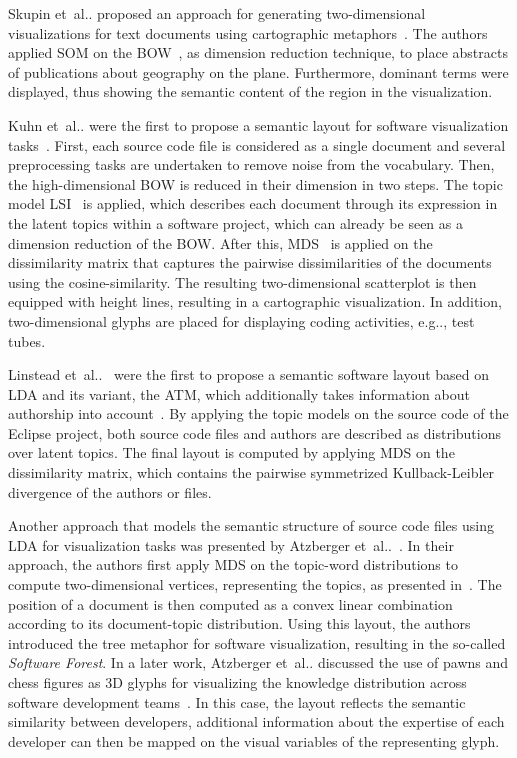\documentclass[runningheads]{llncs}
\makeatletter
\DeclareRobustCommand\onedot{\futurelet\@let@token\@onedot}
\def\@onedot{\ifx\@let@token.\else.\null\fi\xspace}
\def\etal{et~al\onedot}
\def\eg{e.g\onedot,\xspace}
\makeatother
\begin{document}
Skupin \etal proposed an approach for generating two-dimensional visualizations for text documents using cartographic metaphors~\cite{skupin2004worldofgeography}.
The authors applied \ac{SOM} on the \ac{BOW}~\cite{kohonen1997som}, as dimension reduction technique, to place abstracts of publications about geography on the plane.
Furthermore, dominant terms were displayed, thus showing the semantic content of the region in the visualization.

Kuhn \etal were the first to propose a semantic layout for software visualization tasks~\cite{kuhn2008consistentlayout,kuhn2010software}.
First, each source code file is considered as a single document and several preprocessing tasks are undertaken to remove noise from the vocabulary.
Then, the high-dimensional \ac{BOW} is reduced in their dimension in two steps.
The topic model \ac{LSI}~\cite{deerwester1990indexing} is applied, which describes each document through its expression in the latent topics within a software project, which can already be seen as a dimension reduction of the \ac{BOW}.
After this, \ac{MDS}~\cite{cox2008multidimensional} is applied on the dissimilarity matrix that captures the pairwise dissimilarities of the documents using the cosine-similarity.
The resulting two-dimensional scatterplot is then equipped with height lines, resulting in a cartographic visualization.
In addition, two-dimensional glyphs are placed for displaying coding activities, \eg test tubes.

Linstead \etal~\cite{linstead2007eclipseeeveloper,linstead09sourcerer} were the first to propose a semantic software layout based on \ac{LDA} and its variant, the \ac{ATM}, which additionally takes information about authorship into account~\cite{rosen-zvi2004authors}.
By applying the topic models on the source code of the Eclipse project, both source code files and authors are described as distributions over latent topics.
The final layout is computed by applying \ac{MDS} on the dissimilarity matrix, which contains the pairwise symmetrized Kullback-Leibler divergence of the authors or files.

Another approach that models the semantic structure of source code files using \ac{LDA} for visualization tasks was presented by Atzberger \etal~\cite{atzberger2021softwareforest}.
In their approach, the authors first apply \ac{MDS} on the topic-word distributions to compute two-dimensional vertices, representing the topics, as presented in~\cite{sievert2014ldavis}.
The position of a document is then computed as a convex linear combination according to its document-topic distribution.
Using this layout, the authors introduced the tree metaphor for software visualization, resulting in the so-called \emph{Software Forest}.
In a later work, Atzberger \etal discussed the use of pawns and chess figures as 3D glyphs for visualizing the knowledge distribution across software development teams~\cite{atzberger2022-knowhowmap}.
In this case, the layout reflects the semantic similarity between developers, additional information about the expertise of each developer can then be mapped on the visual variables of the representing glyph.
\end{document}
